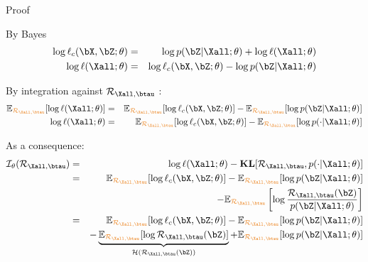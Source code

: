 \documentclass[compress,10pt]{beamer}
\begin{document}
 \begin{frame}[allowframebreaks]{Proof}

By Bayes
\begin{eqnarray*}
\log \ell_c(\bX,\bZ; \theta)&=& \log  p(\bZ | \Xall; \theta) +   \log \ell(\Xall ; \theta)   \\
 \log \ell(\Xall ; \theta) &=& \log \ell_c(\bX,\bZ; \theta) -  \log  p(\bZ | \Xall; \theta)
\end{eqnarray*}

By integration against $\mathcal{R}_{\Xall,\btau}$ : 
\begin{eqnarray*}
 \mathbb{E}_{\color{dgreen}\mathcal{R}_{\Xall,\btau}} [ \log  \ell(\Xall ; \theta)] &=&  \mathbb{E}_{\color{dgreen}\mathcal{R}_{\Xall,\btau}} [\log \ell_c(\bX,\bZ; \theta)] -  \mathbb{E}_{\color{dgreen}\mathcal{R}_{\Xall,\btau}} [ \log  p(\bZ | \Xall; \theta)] \\
 \log \ell(\Xall ; \theta) &=&  \mathbb{E}_{\color{dgreen}\mathcal{R}_{\Xall,\btau}} [\log \ell_c(\bX,\bZ; \theta)] -  \mathbb{E}_{\color{dgreen}\mathcal{R}_{\Xall,\btau}} [ \log  p(\cdot | \Xall; \theta)]
\end{eqnarray*}

As a consequence: 
\begin{eqnarray*}
\mathcal{I}_{\theta}(\mathcal{R}_{\Xall,\btau}) &=& \log \ell(\Xall ; \theta) -   \mathbf{KL}[\mathcal{R}_{\Xall,\btau}, p(\cdot | \Xall; \theta)] \\
 &=& \mathbb{E}_{\color{dgreen}\mathcal{R}_{\Xall,\btau}} [\log \ell_c(\bX,\bZ; \theta)] -  \mathbb{E}_{\color{dgreen}\mathcal{R}_{\Xall,\btau}} [ \log  p(\bZ | \Xall; \theta)]  \\
&& -   \mathbb{E}_{\color{dgreen}\mathcal{R}_{\Xall,\btau}} \left[\log \frac{\mathcal{R}_{\Xall,\btau}(\bZ)} { p(\bZ | \Xall; \theta)}\right]\\
&=&  \mathbb{E}_{\color{dgreen}\mathcal{R}_{\Xall,\btau}} [\log \ell_c(\bX,\bZ; \theta)] -  \mathbb{E}_{\color{dgreen}\mathcal{R}_{\Xall,\btau}} [ \log  p(\bZ | \Xall; \theta)] \\
&& -   \underbrace{\mathbb{E}_{\color{dgreen}\mathcal{R}_{\Xall,\btau}} [\log \mathcal{R}_{\Xall,\btau}(\bZ)]}_{  \mathcal{H}\left(\mathcal{R}_{\Xall,\btau}(\bZ)\right) } +  \mathbb{E}_{\color{dgreen}\mathcal{R}_{\Xall,\btau}} [\log p(\bZ | \Xall; \theta)]
\end{eqnarray*}




  \end{frame}
\end{document}
